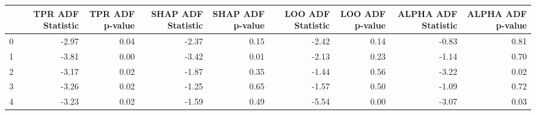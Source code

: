 \begin{tabular}{lrrrrrrrr}
\toprule
 & TPR ADF Statistic & TPR ADF p-value & SHAP ADF Statistic & SHAP ADF p-value & LOO ADF Statistic & LOO ADF p-value & ALPHA ADF Statistic & ALPHA ADF p-value \\
\midrule
0 & -2.97 & 0.04 & -2.37 & 0.15 & -2.42 & 0.14 & -0.83 & 0.81 \\
1 & -3.81 & 0.00 & -3.42 & 0.01 & -2.13 & 0.23 & -1.14 & 0.70 \\
2 & -3.17 & 0.02 & -1.87 & 0.35 & -1.44 & 0.56 & -3.22 & 0.02 \\
3 & -3.26 & 0.02 & -1.25 & 0.65 & -1.57 & 0.50 & -1.09 & 0.72 \\
4 & -3.23 & 0.02 & -1.59 & 0.49 & -5.54 & 0.00 & -3.07 & 0.03 \\
\bottomrule
\end{tabular}
